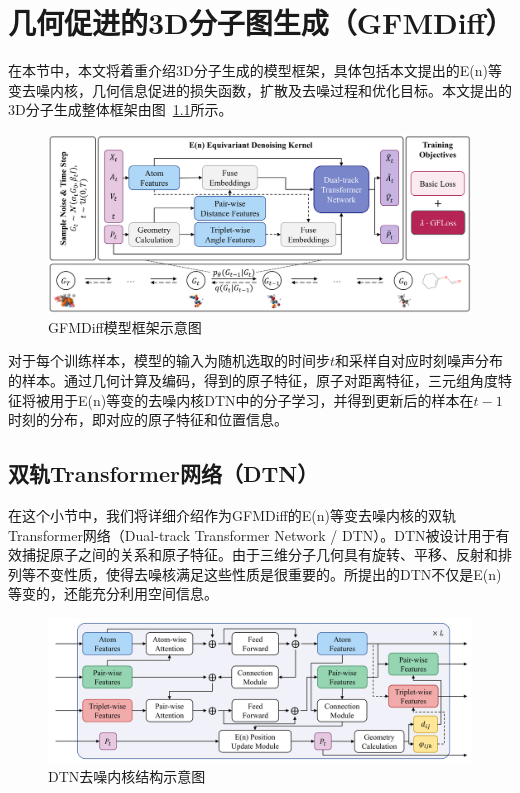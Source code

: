 \chapter{几何促进的3D分子图生成（GFMDiff）}
\label{chap:gfmdiff}

在本节中，本文将着重介绍3D分子生成的模型框架，具体包括本文提出的E(n)等变去噪内核，几何信息促进的损失函数，扩散及去噪过程和优化目标。本文提出的3D分子生成整体框架由图~\ref{fig:gfmdiff}所示。

\begin{figure}[h]
    \centering
    \includegraphics[width=\linewidth]{figures/overview_gfmdiff.png}
    \caption{GFMDiff模型框架示意图}
    \label{fig:gfmdiff}
  \end{figure} 

对于每个训练样本，模型的输入为随机选取的时间步$t$和采样自对应时刻噪声分布的样本。通过几何计算及编码，得到的原子特征，原子对距离特征，三元组角度特征将被用于E(n)等变的去噪内核DTN中的分子学习，并得到更新后的样本在$t-1$时刻的分布，即对应的原子特征和位置信息。

\section{双轨Transformer网络（DTN）}

在这个小节中，我们将详细介绍作为GFMDiff的E(n)等变去噪内核的双轨Transformer网络（Dual-track Transformer Network / DTN）。DTN被设计用于有效捕捉原子之间的关系和原子特征。由于三维分子几何具有旋转、平移、反射和排列等不变性质，使得去噪核满足这些性质是很重要的。所提出的DTN不仅是E(n)等变的，还能充分利用空间信息。

\begin{figure}[h]
  \centering
  \includegraphics[width=\linewidth]{figures/structure_dtn.png}
  \caption{DTN去噪内核结构示意图}
  \label{fig:dtn}
\end{figure}

